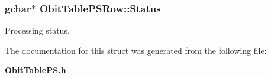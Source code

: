 \subsubsection{\setlength{\rightskip}{0pt plus 5cm}gchar$\ast$ {\bf Obit\-Table\-PSRow::Status}}\label{structObitTablePSRow_o12}


Processing status. 



The documentation for this struct was generated from the following file:\begin{CompactItemize}
\item 
{\bf Obit\-Table\-PS.h}\end{CompactItemize}

